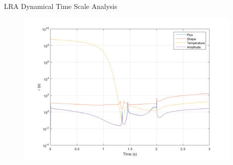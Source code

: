 \documentclass[8pt,xcolor=dvipnames]{beamer}
\begin{document}
\begin{frame}{LRA Dynamical Time Scale Analysis}

\begin{figure}
\includegraphics[width=\linewidth,height=3in,keepaspectratio]{figures/time_constant_lra.png}
\end{figure}

\end{frame}
\end{document}
